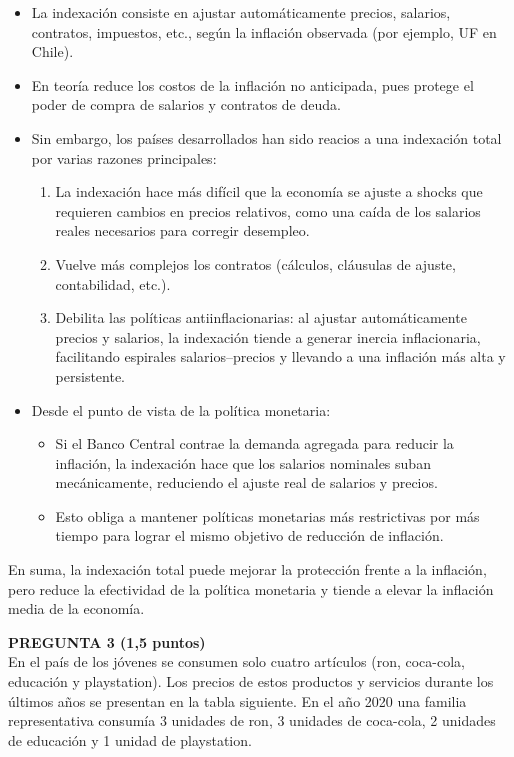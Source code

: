 \documentclass[11pt,addpoints]{article}
\begin{document}
\begin{itemize}
  \item La indexación consiste en ajustar automáticamente precios, salarios, contratos, impuestos, etc., según la inflación observada (por ejemplo, UF en Chile).
  \item En teoría reduce los costos de la inflación no anticipada, pues protege el poder de compra de salarios y contratos de deuda.
\newpage
\vspace*{0.5cm}
  \item Sin embargo, los países desarrollados han sido reacios a una indexación total por varias razones principales:
  \begin{enumerate}
    \item La indexación hace más difícil que la economía se ajuste a shocks que requieren cambios en precios relativos, como una caída de los salarios reales necesarios para corregir desempleo.
    \item Vuelve más complejos los contratos (cálculos, cláusulas de ajuste, contabilidad, etc.).
    \item Debilita las políticas antiinflacionarias: al ajustar automáticamente precios y salarios, la indexación tiende a generar inercia inflacionaria, facilitando espirales salarios–precios y llevando a una inflación más alta y persistente.
  \end{enumerate}
  \item Desde el punto de vista de la política monetaria:
  \begin{itemize}
    \item Si el Banco Central contrae la demanda agregada para reducir la inflación, la indexación hace que los salarios nominales suban mecánicamente, reduciendo el ajuste real de salarios y precios.
    \item Esto obliga a mantener políticas monetarias más restrictivas por más tiempo para lograr el mismo objetivo de reducción de inflación.
  \end{itemize}
\end{itemize}

En suma, la indexación total puede mejorar la protección frente a la inflación, pero reduce la efectividad de la política monetaria y tiende a elevar la inflación media de la economía.

\vspace{0.4cm}

\textbf{PREGUNTA 3 (1,5 puntos)}\\[0.2cm]
En el país de los jóvenes se consumen solo cuatro artículos (ron, coca-cola, educación y playstation). Los precios de estos productos y servicios durante los últimos años se presentan en la tabla siguiente. En el año 2020 una familia representativa consumía 3 unidades de ron, 3 unidades de coca-cola, 2 unidades de educación y 1 unidad de playstation.
\end{document}
